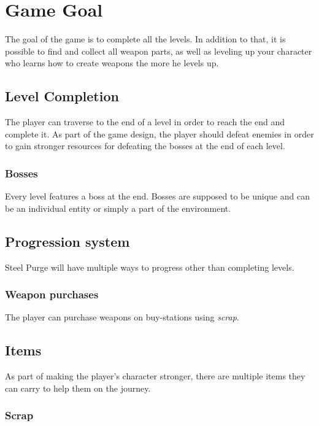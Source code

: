 \documentclass[../Main.tex]{subfiles}
\begin{document}
\section{Game Goal}

The goal of the game is to complete all the levels. In addition to that, it is possible to find and collect all weapon parts, as well as leveling up your character who learns how to create weapons the more he levels up. 

\subsection{Level Completion}

The player can traverse to the end of a level in order to reach the end and complete it. As part of the game design, the player should defeat enemies in order to gain stronger resources for defeating the bosses at the end of each level.

\subsubsection{Bosses}

Every level features a boss at the end. Bosses are supposed to be unique and can be an individual entity or simply a part of the environment.

\subsection{Progression system}

Steel Purge will have multiple ways to progress other than completing levels.

\subsubsection{Weapon purchases}

The player can purchase weapons on buy-stations using \emph{scrap}.

\subsection{Items}

As part of making the player's character stronger, there are multiple items they can carry to help them on the journey.

\subsubsection{Scrap}
\end{document}
